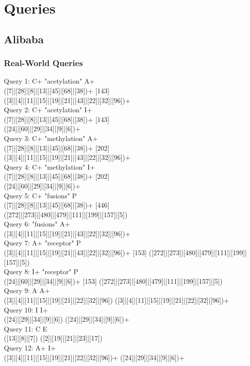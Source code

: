 
\chapter{\label{cha:glossary}Queries}

\section{Alibaba}
\subsection{Real-World Queries}
Query 1: C+ "acetylation" A+
\\([7]|[28]|[8]|[13]|[45]|[68]|[38])+ [143] \\([3]|[4]|[11]|[15]|[19]|[21]|[43]|[22]|[32]|[96])+
\\Query 2: C+ "acetylation" I+
\\([7]|[28]|[8]|[13]|[45]|[68]|[38])+ [143] \\([24]|[60]|[29]|[34]|[9]|[6])+
\\Query 3: C+ "methylation" A+
\\([7]|[28]|[8]|[13]|[45]|[68]|[38])+ [202] \\([3]|[4]|[11]|[15]|[19]|[21]|[43]|[22]|[32]|[96])+
\\Query 4: C+ "methylation" I+ 
\\([7]|[28]|[8]|[13]|[45]|[68]|[38])+ [202] \\([24]|[60]|[29]|[34]|[9]|[6])+
\\Query 5: C+ "fusions" P
\\([7]|[28]|[8]|[13]|[45]|[68]|[38])+ [446] \\([272]|[273]|[480]|[479]|[111]|[199]|[157]|[5])
\\Query 6: "fusions" A+ 
\\\relax [446] ([3]|[4]|[11]|[15]|[19]|[21]|[43]|[22]|[32]|[96])+
\\Query 7: A+ "receptor" P 
\\([3]|[4]|[11]|[15]|[19]|[21]|[43]|[22]|[32]|[96])+ [153] ([272]|[273]|[480]|[479]|[111]|[199]|[157]|[5])
\\Query 8: I+ "receptor" P
\\([24]|[60]|[29]|[34]|[9]|[6])+ [153] ([272]|[273]|[480]|[479]|[111]|[199]|[157]|[5])
\\Query 9: A A+
\\([3]|[4]|[11]|[15]|[19]|[21]|[22]|[32]|[96]) ([3]|[4]|[11]|[15]|[19]|[21]|[22]|[32]|[96])+
\\Query 10: I I+
\\([24]|[29]|[34]|[9]|[6]) ([24]|[29]|[34]|[9]|[6])+
\\Query 11: C E
\\([13]|[8]|[7]) ([2]|[19]|[21]|[23]|[17])
\\Query 12: A+ I+
\\([3]|[4]|[11]|[15]|[19]|[21]|[22]|[32]|[96])+ ([24]|[29]|[34]|[9]|[6])+

